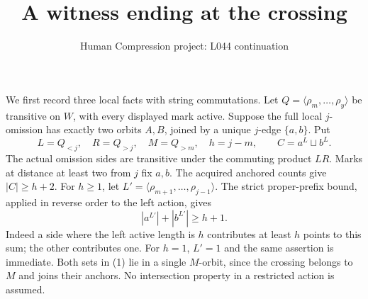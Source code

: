 \documentclass[11pt,a4paper]{article}
\title{A witness ending at the crossing}
\author{Human Compression project: L044 continuation}
\date{}
\newcommand{\gen}[1]{\langle#1\rangle}
\begin{document}
\maketitle
We first record three local facts with string commutations.
Let $Q=\gen{\rho_m,\ldots,\rho_y}$ be transitive on $W$,
with every displayed mark active. Suppose the full local
$j$-omission has exactly two orbits $A,B$, joined by a
unique $j$-edge $\{a,b\}$. Put
\[
 L=Q_{<j},\quad R=Q_{>j},\quad M=Q_{>m},\quad h=j-m,
 \qquad C=a^L\sqcup b^L.
\]
The actual omission sides are transitive under the commuting
product $LR$. Marks at distance at least two from $j$ fix
$a,b$. The acquired anchored counts give $|C|\ge h+2$.
For $h\ge1$, let $L'=\gen{\rho_{m+1},\ldots,\rho_{j-1}}$.
The strict proper-prefix bound, applied in reverse order
to the left action, gives
\[
                 |a^{L'}|+|b^{L'}|\ge h+1.       \tag{1}
\]
Indeed a side where the left active length is $h$ contributes
at least $h$ points to this sum; the other contributes one.
For $h=1$, $L'=1$ and the same assertion is immediate.
Both sets in (1) lie in a single $M$-orbit, since the
crossing belongs to $M$ and joins their anchors.
No intersection property in a restricted action is assumed.
\end{document}

